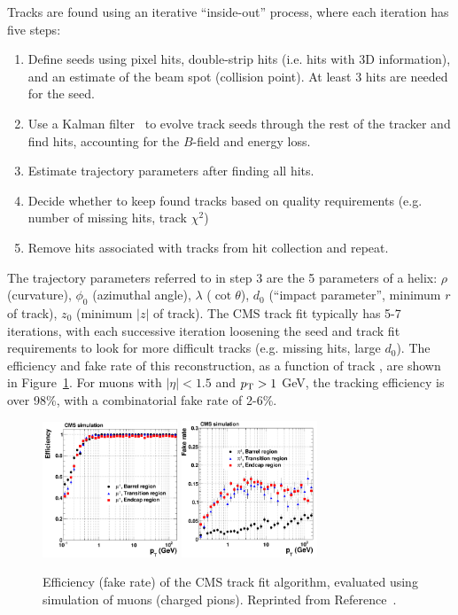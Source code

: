 Tracks are found using an iterative ``inside-out'' process, where each iteration has five steps:
\begin{enumerate}
    \item Define seeds using pixel hits, double-strip hits (i.e. hits with 3D information), and an estimate of the beam spot (collision point). At least 3 hits are needed for the seed.
    \item Use a Kalman filter~\cite{kalman2,kalman1} to evolve track seeds through the rest of the tracker and find hits, accounting for the $B$-field and energy loss.
    \item Estimate trajectory parameters after finding all hits.
    \item Decide whether to keep found tracks based on quality requirements (e.g. number of missing hits, track $\chi^2$)
    \item Remove hits associated with tracks from hit collection and repeat.
\end{enumerate}
The trajectory parameters referred to in step 3 are the 5 parameters of a helix: $\rho$ (curvature), $\phi_0$ (azimuthal angle), $\lambda$ ($\cot\theta$), $d_0$ (``impact parameter'', minimum $r$ of track), $z_0$ (minimum $|z|$ of track).
The CMS track fit typically has 5-7 iterations, with each successive iteration loosening the seed and track fit requirements to look for more difficult tracks (e.g. missing hits, large $d_0$).
The efficiency and fake rate of this reconstruction, as a function of track \pt, are shown in Figure~\ref{fig:cms:trackeff}.
For muons with $|\eta|<1.5$ and $p_\mathrm{T}>1$ GeV, the tracking efficiency is over 98\%, with a combinatorial fake rate of 2-6\%. 

\begin{figure}[]
    \begin{center} 
        \includegraphics[width=0.36\textwidth]{figures/cms/track_eff.png}
        \includegraphics[width=0.36\textwidth]{figures/cms/track_fake.png}
        \caption{Efficiency (fake rate) of the CMS track fit algorithm, evaluated using simulation of muons (charged pions).
                 Reprinted from Reference~\cite{cmstracker}.}
        \label{fig:cms:trackeff}
    \end{center}
\end{figure}

